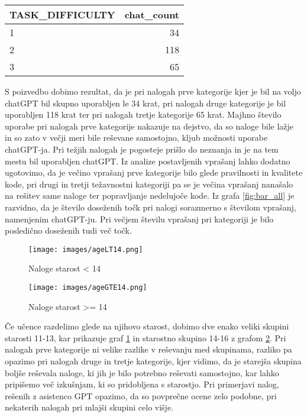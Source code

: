 \documentclass[a4paper,12pt,openright]{book}
\begin{document}
\begin{tabular}{|l|r|}
\hline
\textbf{TASK\_DIFFICULTY} & \textbf{chat\_count} \\
\hline
1 & 34 \\
\hline
2 & 118 \\
\hline
3 & 65 \\
\hline
\end{tabular}
\newline
\newline
S poizvedbo dobimo rezultat, da je pri nalogah prve kategorije kjer je bil na voljo chatGPT bil skupno uporabljen le 34 krat, pri nalogah druge kategorije je bil uporabljen 118 krat ter pri nalogah tretje kategorije 65 krat. Majhno število uporabe pri nalogah prve kategorije nakazuje na dejstvo, da so naloge bile lažje in so zato v večji meri bile reševane samostojno, kljub možnosti uporabe chatGPT-ja. Pri težjih nalogah je pogosteje prišlo do neznanja in je na tem mestu bil uporabljen chatGPT. Iz analize postavljenih vprašanj lahko dodatno ugotovimo, da je večino vprašanj prve kategorije bilo glede pravilnosti in kvalitete kode, pri drugi in tretji težavnostni kategoriji pa se je večina vprašanj nanašalo na rešitev same naloge ter popravljanje nedelujoče kode.
Iz grafa \ref{fig:bar_all} je razvidno, da je število doseženih točk pri nalogi sorazmerno s številom vprašanj, namenjenim chatGPT-ju. Pri večjem številu vprašanj pri kategoriji je bilo posledično doseženih tudi več točk. 

\pagebreak
\begin{figure}[H]
    \centering
    \texttt{[image: images/ageLT14.png]}
    \caption{Naloge starost < 14}
    \label{fig:ageLT14}
\end{figure}

\begin{figure}[H]
    \centering
    \texttt{[image: images/ageGTE14.png]}
    \caption{Naloge starost >= 14}
    \label{fig:ageGTE14}
\end{figure}

Če učence razdelimo glede na njihovo starost, dobimo dve enako veliki skupini starosti 11-13, kar prikazuje graf \ref{fig:ageLT14} in starostno skupino 14-16 z grafom \ref{fig:ageGTE14}. Pri nalogah prve kategorije ni velike razlike v reševanju med skupinama, razliko pa opazimo pri nalogah druge in tretje kategorije, kjer vidimo, da je starejša skupina boljše reševala naloge, ki jih je bilo potrebno reševati samostojno, kar lahko pripišemo več izkušnjam, ki so pridobljena s starostjo. Pri primerjavi nalog, rešenih z asistenco GPT opazimo, da so povprečne ocene zelo podobne, pri nekaterih nalogah pri mlajši skupini celo višje.
\end{document}
